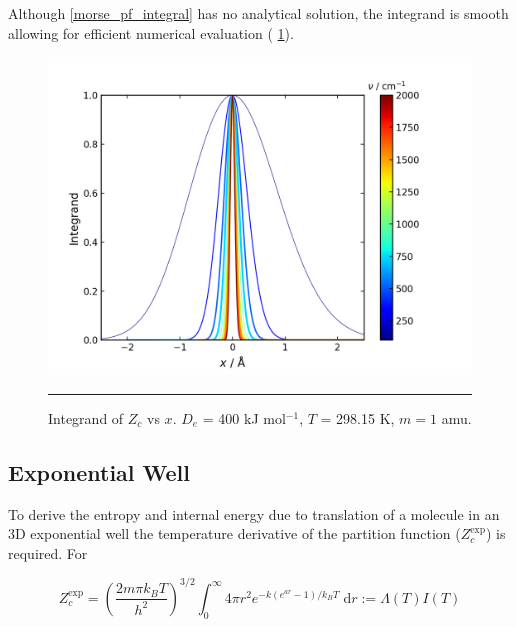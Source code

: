 \documentclass[../main.tex]{subfiles}
\begin{document}
Although \eqref{morse_pf_integral} has no analytical solution, the integrand is smooth allowing for efficient numerical evaluation (\figurename{ \ref{morse_pf_integrand_vs_x}}).

\begin{figure}[h!]
	\centering
	\includegraphics[width=12cm]{8/figs/morse_pf_integrand_vs_x}
	\vspace{0.2cm}
	\hrule
	\caption{Integrand of $Z_c$ vs $x$. $D_e$ = 400 kJ mol$^{-1}$, $T$ = 298.15 K, $m = 1$ amu.}
	\label{morse_pf_integrand_vs_x}
\end{figure}

\subsection{Exponential Well}

To derive the entropy and internal energy due to translation of a molecule in an 3D exponential well the temperature derivative of the partition function ($Z_c^\text{exp}$) is required. For

\begin{equation}
	Z_c^\text{exp} =\left(\frac{2m\pi k_B T}{h^2} \right)^{3/2} \int_0^\infty 4\pi r^2 e^{- k(e^{ar} - 1) / k_B T} \; \text{d}r :=  \Lambda(T) I(T)
\end{equation}
\end{document}
